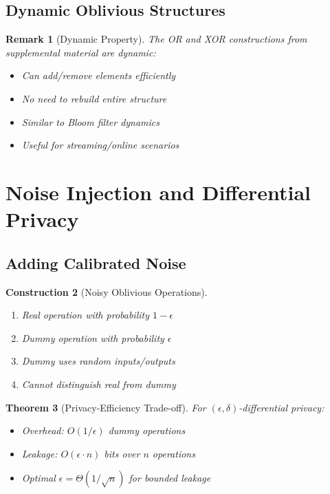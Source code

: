 \documentclass[11pt,final,hidelinks]{article}
\newtheorem{theorem}{Theorem}[section]
\newtheorem{remark}[theorem]{Remark}
\newtheorem{construction}[theorem]{Construction}
\begin{document}
\subsection{Dynamic Oblivious Structures}

\begin{remark}[Dynamic Property]
The OR and XOR constructions from supplemental material are dynamic:
\begin{itemize}
    \item Can add/remove elements efficiently
    \item No need to rebuild entire structure
    \item Similar to Bloom filter dynamics
    \item Useful for streaming/online scenarios
\end{itemize}
\end{remark}

\section{Noise Injection and Differential Privacy}

\subsection{Adding Calibrated Noise}

\begin{construction}[Noisy Oblivious Operations]
\begin{enumerate}
    \item Real operation with probability $1-\epsilon$
    \item Dummy operation with probability $\epsilon$
    \item Dummy uses random inputs/outputs
    \item Cannot distinguish real from dummy
\end{enumerate}
\end{construction}

\begin{theorem}[Privacy-Efficiency Trade-off]
For $(\epsilon, \delta)$-differential privacy:
\begin{itemize}
    \item Overhead: $O(1/\epsilon)$ dummy operations
    \item Leakage: $O(\epsilon \cdot n)$ bits over $n$ operations
    \item Optimal $\epsilon = \Theta(1/\sqrt{n})$ for bounded leakage
\end{itemize}
\end{theorem}
\end{document}
